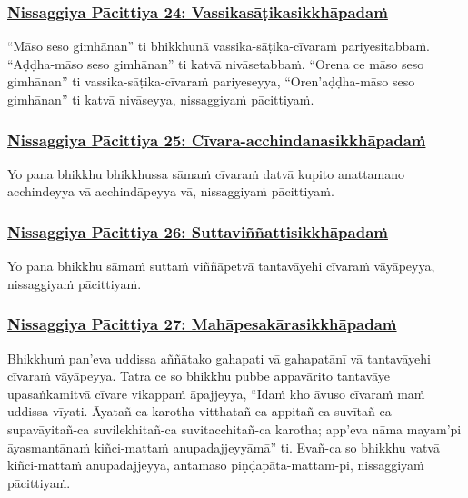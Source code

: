 \subsubsection*{\hyperref[forf-exp24]{Nissaggiya Pācittiya 24: Vassikasāṭikasikkhāpadaṁ}}
\label{np24}

“Māso seso gimhānan” ti bhikkhunā vassika-sāṭika-cīvaraṁ pariyesitabbaṁ. “Aḍḍha-māso seso gimhānan” ti katvā nivāsetabbaṁ. “Orena ce māso seso gimhānan” ti vassika-sāṭika-cīvaraṁ pariyeseyya, “Oren'aḍḍha-māso seso gimhānan” ti katvā nivāseyya, nissaggiyaṁ pācittiyaṁ.

\subsubsection*{\hyperref[forf-exp25]{Nissaggiya Pācittiya 25: Cīvara-acchindanasikkhāpadaṁ}}
\label{np25}

Yo pana bhikkhu bhikkhussa sāmaṁ cīvaraṁ datvā kupito anattamano acchindeyya vā acchindāpeyya vā, nissaggiyaṁ pācittiyaṁ.

\subsubsection*{\hyperref[forf-exp26]{Nissaggiya Pācittiya 26: Suttaviññattisikkhāpadaṁ}}
\label{np26}

Yo pana bhikkhu sāmaṁ suttaṁ viññāpetvā tantavāyehi cīvaraṁ vāyāpeyya, nissaggiyaṁ pācittiyaṁ.

\subsubsection*{\hyperref[forf-exp27]{Nissaggiya Pācittiya 27: Mahāpesakārasikkhāpadaṁ}}
\label{np27}

Bhikkhuṁ pan'eva uddissa aññātako gahapati vā gahapatānī vā tantavāyehi cīvaraṁ vāyāpeyya. Tatra ce so bhikkhu pubbe appavārito tantavāye upasaṅkamitvā cīvare vikappaṁ āpajjeyya, “Idaṁ kho āvuso cīvaraṁ maṁ uddissa vīyati. Āyatañ-ca karotha vitthatañ-ca appitañ-ca suvītañ-ca supavāyitañ-ca suvilekhitañ-ca suvitacchitañ-ca karotha; app'eva nāma mayam'pi āyasmantānaṁ kiñci-mattaṁ anupadajjeyyāmā” ti. Evañ-ca so bhikkhu vatvā kiñci-mattaṁ anupadajjeyya, antamaso piṇḍapāta-mattam-pi, nissaggiyaṁ pācittiyaṁ.

